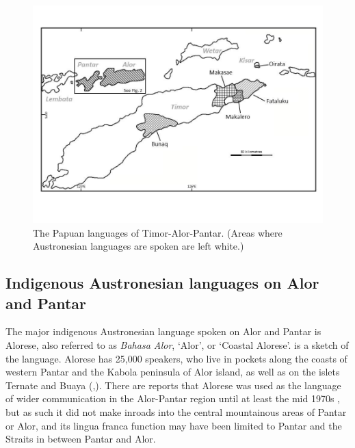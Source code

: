 


\begin{figure}
\includegraphics[width=\textwidth]{figures/ch1fig3.jpg}
\caption{The Papuan languages of Timor-Alor-Pantar. (Areas where Austronesian languages are spoken are left white.)}
\label{fig:1:Map3}
\end{figure} 






\subsection{Indigenous Austronesian languages on Alor and Pantar} \label{sec:1:2.2}
The major indigenous Austronesian language spoken on Alor and Pantar is Alorese, also referred to as \textit{Bahasa Alor}, `Alor', or `Coastal Alorese'. \citet{Klamer2011} is a sketch of the language. Alorese has 25,000 speakers, who live in pockets along the coasts of western Pantar and the Kabola peninsula of Alor island, as well as on the islets Ternate and Buaya (\citealt[8-9]{Stokhof1975},\citealt{GrimesEtAl1997,Lewis2009}). There are reports that Alorese was used as the language of wider communication in the Alor-Pantar region until at least the mid 1970s \citep[see][8]{Stokhof1975}, but as such it did not make inroads into the central mountainous areas of Pantar or Alor, and its lingua franca function may have been limited to Pantar and the Straits in between Pantar and Alor.

